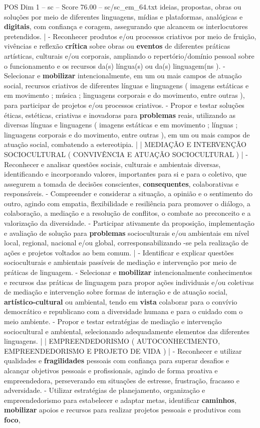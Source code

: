 \begin{textsample}{POS Dim 1 – sc – Score 76.00 – sc/sc\_em\_64.txt}
ideias, propostas, obras ou soluções por meio de diferentes linguagens, mídias e plataformas, analógicas e \textbf{digitais}, com confiança e coragem, assegurando que alcancem os interlocutores pretendidos. | - Reconhecer produtos e/ou processos criativos por meio de fruição, vivências e reflexão \textbf{crítica} sobre obras ou \textbf{eventos} de diferentes práticas artísticas, culturais e/ou corporais, ampliando o repertório/domínio pessoal sobre o funcionamento e os recursos da(s) língua(s) ou da(s) linguagem(ns ). - Selecionar e \textbf{mobilizar} intencionalmente, em um ou mais campos de atuação social, recursos criativos de diferentes línguas e linguagens ( imagens estáticas e em movimento ; música ; linguagens corporais e do movimento, entre outras ), para participar de projetos e/ou processos criativos. - Propor e testar soluções éticas, estéticas, criativas e inovadoras para \textbf{problemas} reais, utilizando as diversas línguas e linguagens ( imagens estáticas e em movimento ; línguas ; linguagens corporais e do movimento, entre outras ), em um ou mais campos de atuação social, combatendo a estereotipia. | | MEDIAÇÃO E INTERVENÇÃO SOCIOCULTURAL ( CONVIVÊNCIA E ATUAÇÃO SOCIOCULTURAL ) | - Reconhecer e analisar questões sociais, culturais e ambientais diversas, identificando e incorporando valores, importantes para si e para o coletivo, que assegurem a tomada de decisões conscientes, \textbf{consequentes}, colaborativas e responsáveis. - Compreender e considerar a situação, a opinião e o sentimento do outro, agindo com empatia, flexibilidade e resiliência para promover o diálogo, a colaboração, a mediação e a resolução de conflitos, o combate ao preconceito e a valorização da diversidade. - Participar ativamente da proposição, implementação e avaliação de solução para \textbf{problemas} socioculturais e/ou ambientais em nível local, regional, nacional e/ou global, corresponsabilizando -se pela realização de ações e projetos voltados ao bem comum. | - Identificar e explicar questões socioculturais e ambientais passíveis de mediação e intervenção por meio de práticas de linguagem. - Selecionar e \textbf{mobilizar} intencionalmente conhecimentos e recursos das práticas de linguagem para propor ações individuais e/ou coletivas de mediação e intervenção sobre formas de interação e de atuação social, \textbf{artístico-cultural} ou ambiental, tendo em \textbf{vista} colaborar para o convívio democrático e republicano com a diversidade humana e para o cuidado com o meio ambiente. - Propor e testar estratégias de mediação e intervenção sociocultural e ambiental, selecionando adequadamente elementos das diferentes linguagens. | | EMPREENDEDORISMO ( AUTOCONHECIMENTO, EMPREENDEDORISMO E PROJETO DE VIDA ) | - Reconhecer e utilizar qualidades e \textbf{fragilidades} pessoais com confiança para superar desafios e alcançar objetivos pessoais e profissionais, agindo de forma proativa e empreendedora, perseverando em situações de estresse, frustração, fracasso e adversidade. - Utilizar estratégias de planejamento, organização e empreendedorismo para estabelecer e adaptar metas, identificar \textbf{caminhos}, \textbf{mobilizar} apoios e recursos para realizar projetos pessoais e produtivos com \textbf{foco}, 
\end{textsample}
